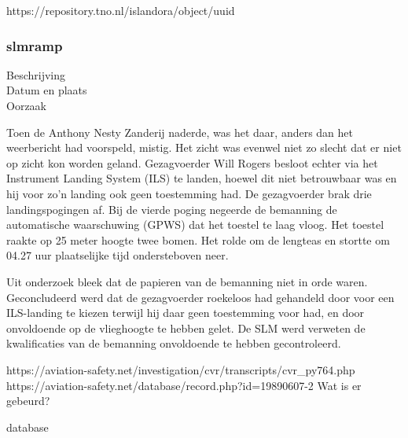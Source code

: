{{https://repository.tno.nl/islandora/object/uuid%



\subsubsection{slmramp}

\begin{description}
	\item[Beschrijving]
	\item[Datum en plaats] 
	\item[Oorzaak]
\end{description}
Toen de Anthony Nesty Zanderij naderde, was het daar, anders dan het weerbericht had voorspeld, mistig. Het zicht was evenwel niet zo slecht dat er niet op zicht kon worden geland. Gezagvoerder Will Rogers besloot echter via het Instrument Landing System (ILS) te landen, hoewel dit niet betrouwbaar was en hij voor zo'n landing ook geen toestemming had. De gezagvoerder brak drie landingspogingen af. Bij de vierde poging negeerde de bemanning de automatische waarschuwing (GPWS) dat het toestel te laag vloog. Het toestel raakte op 25 meter hoogte twee bomen. Het rolde om de lengteas en stortte om 04.27 uur plaatselijke tijd ondersteboven neer.

Uit onderzoek bleek dat de papieren van de bemanning niet in orde waren. 
Geconcludeerd werd dat de gezagvoerder roekeloos had gehandeld door voor een ILS-landing te kiezen terwijl hij daar geen toestemming voor had, en door onvoldoende op de vlieghoogte te hebben gelet. 
De SLM werd verweten de kwalificaties van de bemanning onvoldoende te hebben gecontroleerd.

https://aviation-safety.net/investigation/cvr/transcripts/cvr_py764.php 
https://aviation-safety.net/database/record.php?id=19890607-2 
Wat is er gebeurd?

\cite{espnSLMterugblik}

\cite{dennisRosier01052020}

\cite{hassing07062020slmramp}

\cite{amsterdamArchiefSLM}

\cite{rtvOost06062019nabestaande}

\cite{breda07062021AndroSnel}

\cite{andereTijdenSLMCrash}

\cite{wikiSLMRamp}
database

}}
